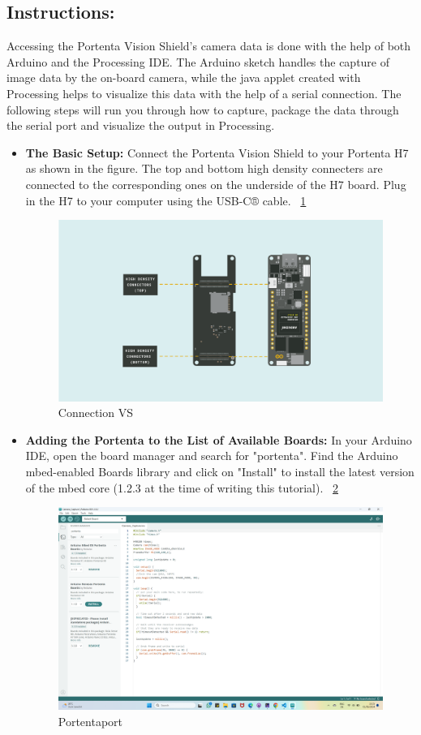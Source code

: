 \subsection{Instructions:}
	Accessing the Portenta Vision Shield's camera data is done with the help of both Arduino and the Processing IDE. The Arduino sketch handles the capture of image data by the on-board camera, while the java applet created with Processing helps to visualize this data with the help of a serial connection. The following steps will run you through how to capture, package the data through the serial port and visualize the output in Processing.
\begin{itemize}
	\item \textbf{The Basic Setup:} Connect the Portenta Vision Shield to your Portenta H7 as shown in the figure. The top and bottom high density connecters are connected to the corresponding ones on the underside of the H7 board. Plug in the H7 to your computer using the USB-C® cable. ~\ref{Connection VS}
	\begin{figure}
		\begin{center}
			\includegraphics[width=0.7\linewidth]{Images/VisionShield/Connection VS.png}
			\caption{Connection VS}
			\label{Connection VS}
		\end{center}
	\end{figure}
	\item \textbf{Adding the Portenta to the List of Available Boards:} In your Arduino IDE, open the board manager and search for "portenta". Find the Arduino mbed-enabled Boards library and click on "Install" to install the latest version of the mbed core (1.2.3 at the time of writing this tutorial). ~\ref{Portentaport}
	\begin{figure}
		\begin{center}
			\includegraphics[width=0.7\linewidth]{Images/PortentaH7/Portentaport.png}
			\caption{Portentaport}
			\label{Portentaport}
		\end{center}
	\end{figure}
	

\end{itemize}
